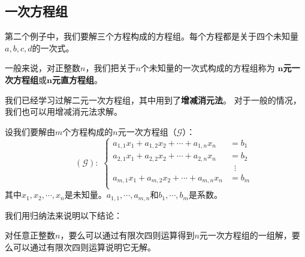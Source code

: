 \documentclass[12pt,UTF8]{ctexbook}
\begin{document}
\subsection{一次方程组}

第二个例子中，我们要解三个方程构成的方程组。每个方程都是关于四个未知量$a,b,c,d$的一次式。

一般来说，对正整数$n$，我们把关于$n$个未知量的一次式构成的方程组称为
$\boldsymbol{n}$\textbf{元一次方程组}或$\boldsymbol{n}$\textbf{元直方程组}。

我们已经学习过解二元一次方程组，其中用到了\textbf{增减消元法}。
对于一般的情况，我们也可以用增减消元法求解。

设我们要解由$m$个方程构成的$n$元一次方程组（$\mathcal{G}$）：
$$
\qquad (\mathcal{G}):\,\,
\left\{
    \begin{aligned}
        a_{1,1} x_1 + a_{1,2} x_2 + \cdots + a_{1,n} x_n &= b_1 \\
        a_{2,1} x_1 + a_{2,2} x_2 + \cdots + a_{2,n} x_n &= b_2 \\
        &\;\;\vdots \\
        a_{m,1} x_1 + a_{m,2} x_2 + \cdots + a_{m,n} x_n &= b_m \\
    \end{aligned}
\right.
$$
其中$x_1, x_2, \cdots , x_n$是未知量。$a_{1,1}, \cdots , a_{m,n}$和$b_1, \cdots , b_m$是系数。

我们用归纳法来说明以下结论：
\begin{tm}
    对任意正整数$n$，要么可以通过有限次四则运算得到$n$元一次方程组的一组解，要么可以通过有限次四则运算说明它无解。
\end{tm}
\end{document}
